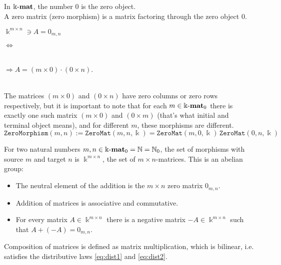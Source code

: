 \begin{example}\label{ex:kmat_pre-additive}
In $\Bbbk\textnormal{-}\mathbf{mat}$, the number $0$ is the zero object.\\
A zero matrix (zero morphism) is a matrix factoring through the zero object $0$.\\
\begin{minipage}{.2\textwidth}\phantom{ }\end{minipage}
\begin{minipage}{.25\textwidth}
$\Bbbk^{m\times n} \ni A = 0_{m,n}$
\end{minipage}
\begin{minipage}{.08\textwidth}
$\Longleftrightarrow$
\end{minipage}
\begin{minipage}{.32\textwidth}
\\
$\Rightarrow A = (m \times 0) \cdot (0 \times n)$.
\end{minipage}
\begin{minipage}{.15\textwidth}\phantom{ }\end{minipage}\\

\noindent The matrices $(m \times 0)$ and $(0 \times n)$ have zero columns or zero rows respectively, but it is
important to note that for each $m \in \Bbbk\textnormal{-}\mathbf{mat}_{0}$ there is exactly one such matrix $(m \times 0)$ and $(0 \times m)$
(that's what initial and terminal object means), and for different $m$, these morphisms are different.
\[
\mathtt{ZeroMorphism}(m,n) := \mathtt{ZeroMat}(m,n,\Bbbk) = \mathtt{ZeroMat}(m,0,\Bbbk)\,\mathtt{ZeroMat}(0,n,\Bbbk)
\]

For two natural numbers $m,n \in {\Bbbk\textnormal{-}\mathbf{mat}}_{0} = \mathbb{N} = \mathbb{N}_{0}$, the set of morphisms with source $m$ and target $n$ is
$\Bbbk^{m\times n}$, the set of $m \times n$-matrices. This is an abelian group:
\begin{itemize}
\item The neutral element of the addition is the $m \times n$ zero matrix $0_{m,n}$.
\item Addition of matrices is associative and commutative.
\item For every matrix $A \in \Bbbk^{m\times n}$ there is a negative matrix $-A \in \Bbbk^{m \times n}$ such that $A + (-A) = 0_{m,n}$.
\end{itemize}
Composition of matrices is defined as matrix multiplication, which is bilinear, i.e. satisfies the distributive laws \eqref{eq:dist1} and
\eqref{eq:dist2}.

\end{example}

